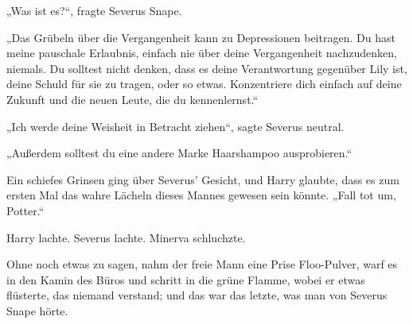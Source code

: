 „Was ist es?“, fragte Severus Snape.

„Das Grübeln über die Vergangenheit kann zu Depressionen beitragen. Du hast meine pauschale Erlaubnis, einfach nie über deine Vergangenheit nachzudenken, niemals. Du solltest nicht denken, dass es deine Verantwortung gegenüber Lily ist, deine Schuld für sie zu tragen, oder so etwas. Konzentriere dich einfach auf deine Zukunft und die neuen Leute, die du kennenlernst.“

„Ich werde deine Weisheit in Betracht ziehen“, sagte Severus neutral.

„Außerdem solltest du eine andere Marke Haarshampoo ausprobieren.“

Ein schiefes Grinsen ging über Severus' Gesicht, und Harry glaubte, dass es zum ersten Mal das wahre Lächeln dieses Mannes gewesen sein könnte.
„Fall tot um, Potter.“

Harry lachte. Severus lachte. Minerva schluchzte.

Ohne noch etwas zu sagen, nahm der freie Mann eine Prise Floo-Pulver, warf es in den Kamin des Büros und schritt in die grüne Flamme, wobei er etwas flüsterte, das niemand verstand; und das war das letzte, was man von Severus Snape hörte.
